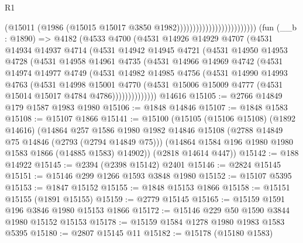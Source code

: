 \begin{lexlean}{R1}
\begin{coremodule}
                                                (@15011
                                                  (@1986
                                                    (@15015
                                                      @15017
                                                      @3850
                                                      @1982)))))))))))))))))))))))))
    (fun (__b : @1890) =>
    @4182
      (@4533
        @4700
        (@4531
          @14926
          @14929
          @4707
          (@4531
            @14934
            @14937
            @4714
            (@4531
              @14942
              @14945
              @4721
              (@4531
                @14950
                @14953
                @4728
                (@4531
                  @14958
                  @14961
                  @4735
                  (@4531
                    @14966
                    @14969
                    @4742
                    (@4531
                      @14974
                      @14977
                      @4749
                      (@4531
                        @14982
                        @14985
                        @4756
                        (@4531
                          @14990
                          @14993
                          @4763
                          (@4531
                            @14998
                            @15001
                            @4770
                            (@4531
                              @15006
                              @15009
                              @4777
                              (@4531 @15014 @15017 @4784 @4786))))))))))))))
    @14616
@15105 := @2766 @14849 @179 @1587 @1983 @1980
@15106 := @1848 @14846
@15107 := @1848 @1583
@15108 := @15107 @1866
@15141 := @15100
    (@15105
      (@15106 @15108)
      (@1892 @14616)
      (@14864
        @257
        @1586
        @1980
        @1982
        @14846
        @15108
        (@2788 @14849 @75 @14846 (@2793 (@2794 @14849 @75)))
        (@14864 @1584 @196 @1980 @1980 @1583 @1866 (@14885 @1583) @14902))
      (@2818 @14614 @447))
@15142 := @188 @14922
@15145 := @2394 (@2398 @15142) @2401
@15146 := @2824 @15145
@15151 := @15146 @299 @1266 @1593 @3848 @1980
@15152 := @15107 @5395
@15153 := @1847 @15152
@15155 := @1848 @15153 @1866
@15158 := @15151 @15155 (@1891 @15155)
@15159 := @2779 @15145
@15165 := @15159 @1591 @196 @3846 @1980 @15153 @1866
@15172 := @15146 @229 @50 @1590 @3844 @1980 @15152 @15153
@15178 := @15159 @1584 @1278 @1980 @1983 @1583 @5395
@15180 := @2807 @15145 @11
@15182 := @15178 (@15180 @1583)

\end{coremodule}
\end{lexlean}
